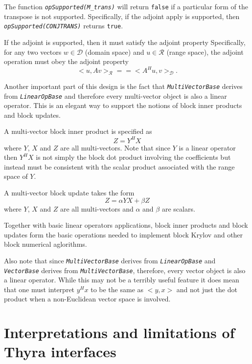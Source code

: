 \documentclass[11pt]{SANDreport}
\begin{document}
The function \texttt{\textit{opSupported(M\_trans)}} will return \texttt{false} if a particular form of the transpose is not supported.  Specifically, if the adjoint apply is supported, then \texttt{\textit{opSupported(CONJTRANS)}} returns \texttt{true}.

If the adjoint is supported, then it must satisfy the adjoint property Specifically, for any two vectors $w\in\mathcal{D}$ (domain space) and $u\in\mathcal{R}$ (range space), the adjoint operation must obey the adjoint property
\[
  <u,A v>_{\mathcal{R}} =\!= <A^H u, v>_{\mathcal{D}}.
\]


Another important part of this design is the fact that \texttt{\textit{Multi\-Vector\-Base}} derives from \texttt{\textit{Linear\-Op\-Base}} and therefore every multi-vector object is also a linear operator.  This is an elegant way to support the notions of block inner products and block updates.

A multi-vector block inner product is specified as
\[
Z = Y^H X
\]
where $Y$, $X$ and $Z$ are all multi-vectors.  Note that since $Y$ is a linear operator then $Y^H X$ is not simply the block dot product involving the coefficients but instead must be consistent with the scalar product associated with the range space of $Y$.

A multi-vector block update takes the form
\[
Z =\alpha Y X + \beta Z
\]
where $Y$, $X$ and $Z$ are all multi-vectors and $\alpha$ and $\beta$ are scalars.

Together with basic linear operators applications, block inner products and block updates form the basic operations needed to implement block Krylov and other block numerical aglorithms.

Also note that since \texttt{\textit{Multi\-Vector\-Base}} derives from \texttt{\textit{Linear\-Op\-Base}} and \texttt{\textit{Vector\-Base}} derives from \texttt{\textit{Multi\-Vector\-Base}}, therefore, every vector object is also a linear operator.  While this may not be a terribly useful feature it does mean that one must interpret $y^H x$ to be the same as $<y,x>$ and not just the dot product when a non-Euclidean vector space is involved.


%
\section{Interpretations and limitations of Thyra interfaces}
%
\end{document}

